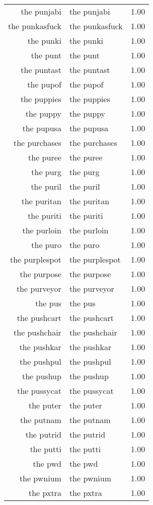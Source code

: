\begin{table}[ht]
\begin{tabular}{rlr}
  the punjabi & the punjabi & 1.00 \\ 
  the punkasfuck & the punkasfuck & 1.00 \\ 
  the punki & the punki & 1.00 \\ 
  the punt & the punt & 1.00 \\ 
  the puntast & the puntast & 1.00 \\ 
  the pupof & the pupof & 1.00 \\ 
  the puppies & the puppies & 1.00 \\ 
  the puppy & the puppy & 1.00 \\ 
  the pupusa & the pupusa & 1.00 \\ 
  the purchases & the purchases & 1.00 \\ 
  the puree & the puree & 1.00 \\ 
  the purg & the purg & 1.00 \\ 
  the puril & the puril & 1.00 \\ 
  the puritan & the puritan & 1.00 \\ 
  the puriti & the puriti & 1.00 \\ 
  the purloin & the purloin & 1.00 \\ 
  the puro & the puro & 1.00 \\ 
  the purplespot & the purplespot & 1.00 \\ 
  the purpose & the purpose & 1.00 \\ 
  the purveyor & the purveyor & 1.00 \\ 
  the pus & the pus & 1.00 \\ 
  the pushcart & the pushcart & 1.00 \\ 
  the pushchair & the pushchair & 1.00 \\ 
  the pushkar & the pushkar & 1.00 \\ 
  the pushpul & the pushpul & 1.00 \\ 
  the pushup & the pushup & 1.00 \\ 
  the pussycat & the pussycat & 1.00 \\ 
  the puter & the puter & 1.00 \\ 
  the putnam & the putnam & 1.00 \\ 
  the putrid & the putrid & 1.00 \\ 
  the putti & the putti & 1.00 \\ 
  the pwd & the pwd & 1.00 \\ 
  the pwnium & the pwnium & 1.00 \\ 
  the pxtra & the pxtra & 1.00 \\ 

\end{tabular}
\end{table}

